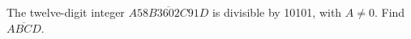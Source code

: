 The twelve-digit integer $\overline{A58B3602C91D}$ is divisible by 10101, with $ A\ne0 $. Find $\overline{ABCD}$.
